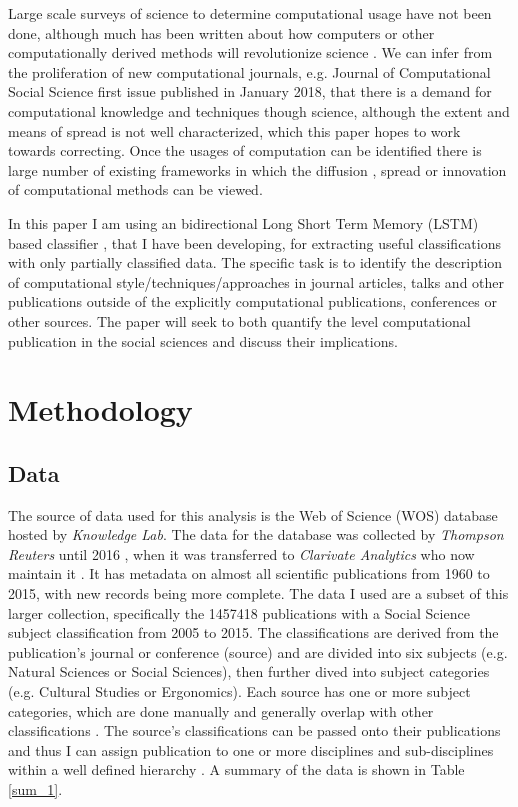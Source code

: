 \documentclass[12pt, a4paper]{article}
\begin{document}
Large scale surveys of science to determine computational usage have not been done, although much has been written about how computers or other computationally derived methods will revolutionize science \citep[e.g.][]{de1997computer, anderson2008end,  provost2013data, john2014big}. We can infer from the proliferation of new computational journals, e.g. Journal of Computational Social Science first issue published in January 2018, that there is a demand for computational knowledge and techniques though science, although the extent and means of spread is not well characterized, which this paper hopes to work towards correcting. Once the usages of computation can be identified there is large number of existing frameworks in which the diffusion \citep{griliches1960hybrid}, spread \citep{padgett1993robust} or innovation \citep{foster2015tradition} of computational methods can be viewed.

In this paper I am using an bidirectional Long Short Term Memory (LSTM) based classifier \cite{graves2005framewise}, that I have been developing, for extracting useful classifications with only partially classified data. The specific task is to identify the description of computational style/techniques/approaches in journal articles, talks and other publications outside of the explicitly computational publications, conferences or other sources. The paper will seek to both quantify the level computational publication in the social sciences and discuss their implications.


\section{Methodology}

\subsection{Data}

The source of data used for this analysis is the  Web of Science (WOS) database hosted by \textit{Knowledge Lab}. The data for the database was collected by \textit{Thompson Reuters} until 2016 , when it was transferred to \textit{Clarivate Analytics} who now maintain it \citep{clarivate}. It has metadata on almost all scientific publications from 1960 to 2015, with new records being more complete. The data I used are a subset of this larger collection, specifically  the \num{1457418} publications with a Social Science subject classification from 2005 to 2015. The classifications are derived from the publication's journal or conference (source) \citep{kottawos} and are divided into six subjects (e.g. Natural Sciences or Social Sciences), then further dived into subject categories (e.g. Cultural Studies or Ergonomics). Each source has one or more subject categories, which are done manually and generally overlap with other classifications \citep{efremenkova2016comparison}. The source's classifications can be passed onto their publications and thus I can assign publication to one or more disciplines and  sub-disciplines within a well defined hierarchy \citep{wossubjects}. A summary of the data is shown in Table \ref{sum_1}.
\end{document}
